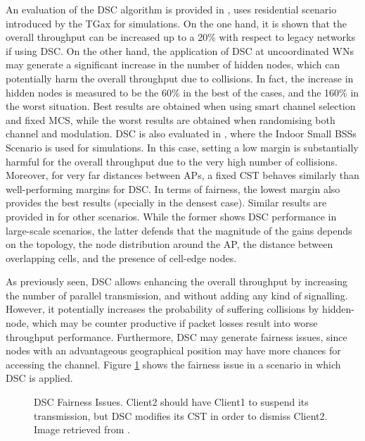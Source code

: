\documentclass[12pt, a4paper,twoside]{tesi_upf}
\begin{document}
				An evaluation of the DSC algorithm is provided in \cite{afaqui2015evaluation}, uses residential scenario introduced by the TGax for simulations. On the one hand, it is shown that the overall throughput can be increased up to a 20\% with respect to legacy networks if using DSC. On the other hand, the application of DSC at uncoordinated WNs may generate a significant increase in the number of hidden nodes, which can potentially harm the overall throughput due to collisions. In fact, the increase in hidden nodes is measured to be the 60\% in the best of the cases, and the 160\% in the worst situation. Best results are obtained when using smart channel selection and fixed MCS, while the worst results are obtained when randomising both channel and modulation. DSC is also evaluated in \cite{zhong2016promise}, where the Indoor Small BSSs Scenario is used for simulations. In this case, setting a low margin is substantially harmful for the overall throughput due to the very high number of collisions. Moreover, for very far distances between APs, a fixed CST behaves similarly than well-performing margins for DSC. In terms of fairness, the lowest margin also provides the best results (specially in the densest case). Similar results are provided in \cite{selinis2016evaluation, kulkarni2015taming} for other scenarios. While the former shows DSC performance in large-scale scenarios, the latter defends that the magnitude of the gains depends on the topology, the node distribution around the AP, the distance between overlapping cells, and the presence of cell-edge nodes. 
				
				As previously seen, DSC allows enhancing the overall throughput by increasing the number of parallel transmission, and without adding any kind of signalling. However, it potentially increases the probability of suffering collisions by hidden-node, which may be counter productive if packet losses result into worse throughput performance. Furthermore, DSC may generate fairness issues, since nodes with an advantageous geographical position may have more chances for accessing the channel. Figure \ref{fig:dsc_problems} shows the fairness issue in a scenario in which DSC is applied.
				\begin{figure}[h!]
					\centering
					\caption{DSC Fairness Issues. Client2 should have Client1 to suspend its transmission, but DSC modifies its CST in order to dismiss Client2. Image retrieved from \cite{zhong2016promise}.}
					\label{fig:dsc_problems}
				\end{figure}
					
\end{document}
